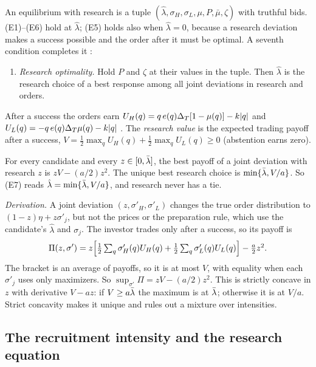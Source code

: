 An equilibrium with research is a tuple \((\hat\lambda,\sigma_H,\sigma_L,\mu,P,\bar\mu,\zeta)\) with truthful bids.
(E1)--(E6) hold at \(\hat\lambda\); (E5) holds also when \(\hat\lambda=0\), because a research deviation makes a success
possible and the order after it must be optimal. A seventh condition completes it :
\begin{enumerate}[label=(E\arabic*),start=7,leftmargin=3em]
\item \emph{Research optimality.} Hold \(P\) and \(\zeta\) at their values in the tuple. Then \(\hat\lambda\) is the research
choice of a best response among all joint deviations in research and orders.
\end{enumerate}
After a success the orders earn \(U_H(q)=q\,e(q)\Delta_T[1-\mu(q)]-k|q|\) and \(U_L(q)=-q\,e(q)\Delta_T\mu(q)-k|q|\)
. The \emph{research value} is the expected trading payoff after a success,
\(V=\tfrac12\max_qU_H(q)+\tfrac12\max_qU_L(q)\ge0\) (abstention earns zero).

\begin{resultbox}
For every candidate and every \(z\in[0,\bar\lambda]\), the best payoff of a joint deviation with research \(z\) is
\(zV-(a/2)z^2\). The unique best research choice is \(\min\{\bar\lambda,V/a\}\). So (E7) reads \(\hat\lambda=\min\{\bar\lambda,V/a\}\),
and research never has a tie.
\end{resultbox}

\emph{Derivation.} A joint deviation \((z,\sigma'_H,\sigma'_L)\) changes the true order distribution to \((1-z)\eta+z\sigma'_j\), but
not the prices or the preparation rule, which use the candidate's \(\hat\lambda\) and \(\sigma_j\). The investor trades only
after a success, so its payoff is
\[
\Pi(z,\sigma')=z\Bigl[\tfrac12\textstyle\sum_q\sigma'_H(q)U_H(q)+\tfrac12\sum_q\sigma'_L(q)U_L(q)\Bigr]-\frac a2z^2 .
\]
The bracket is an average of payoffs, so it is at most \(V\), with equality when each \(\sigma'_j\) uses only maximizers.
So \(\sup_{\sigma'}\Pi=zV-(a/2)z^2\). This is strictly concave in \(z\) with derivative \(V-az\): if \(V\ge a\bar\lambda\) the maximum
is at \(\bar\lambda\); otherwise it is at \(V/a\). Strict concavity makes it unique and rules out a mixture over intensities.

\subsection{The recruitment intensity and the research equation}\label{sec:09_research-equation}

